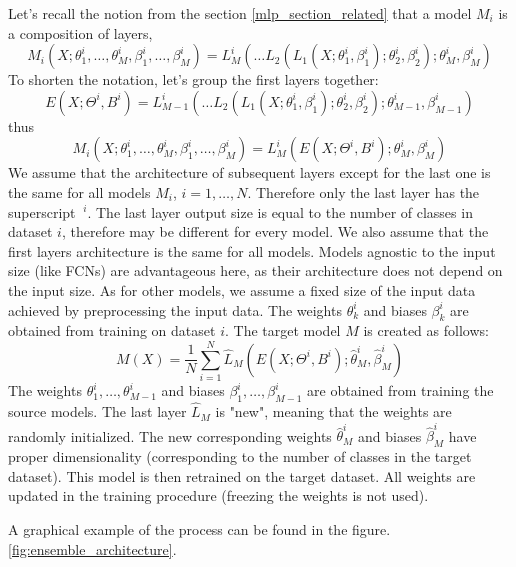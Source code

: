 \documentclass[a4paper,11pt,twoside]{report}
\theoremstyle{definition}
\begin{document}
Let's recall the notion from the section \ref{mlp_section_related} that a model $M_i$ is a composition of layers, $$M_i(X; \theta_1^i,\dots , \theta_M^i, \beta_1^i,\dots , \beta_M^i) = L_M^i(\dots L_2(L_1(X;\theta_1^i, \beta_1^i);\theta_2^i, \beta_2^i);\theta_M^i, \beta_M^i)$$
To shorten the notation, let's group the first layers together:
$$E(X;\Theta^i, B^i) = L_{M-1}^i(\dots L_2(L_1(X;\theta_1^i, \beta_1^i);\theta_2^i, \beta_2^i);\theta_{M-1}^i, \beta_{M-1}^i)$$
thus
$$M_i(X; \theta_1^i,\dots , \theta_M^i, \beta_1^i,\dots , \beta_M^i) =  L_M^i(E(X; \Theta^i, B^i);\theta_M^i, \beta_M^i)$$
We assume that the architecture of subsequent layers except for the last one is the same for all models $M_i$, $i=1, \dots, N$. Therefore only the last layer has the superscript $\ ^i$. The last layer output size is equal to the number of classes in dataset $i$, therefore may be different for every model. We also assume that the first layers architecture is the same for all models. Models agnostic to the input size (like FCNs) are advantageous here, as their architecture does not depend on the input size. As for other models, we assume a fixed size of the input data achieved by preprocessing the input data.
The weights $\theta^i_k$ and biases $\beta^i_k$ are obtained from training on dataset $i$.
The target model $M$ is created as follows:
$$M(X) = \frac{1}{N} \sum_{i=1}^N \hat L_M( E(X; \Theta^i, B^i);\hat\theta_M^i, \hat\beta_M^i )$$
The weights $\theta_1^i, \dots, \theta_{M-1}^i$ and biases $\beta_1^i, \dots, \beta_{M-1}^i$ are obtained from training the source models. The last layer $\hat L_M$ is "new", meaning that the weights are randomly initialized. The new corresponding weights $\hat\theta_M^i$ and biases $\hat\beta_M^i$ have proper dimensionality (corresponding to the number of classes in the target dataset). This model is then retrained on the target dataset. All weights are updated in the training procedure (freezing the weights is not used).

A graphical example of the process can be found in the figure. \ref{fig:ensemble_architecture}.
\end{document}
